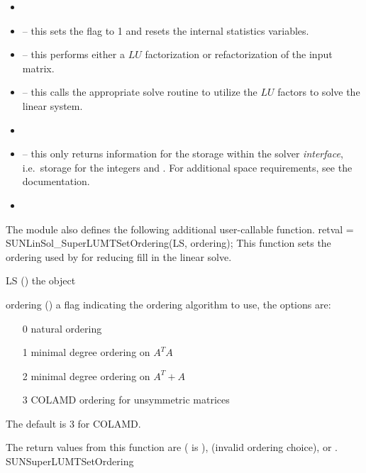 \begin{itemize}
\item {}
\item {} -- this sets the
   flag to 1 and resets the internal {\superlumt}
  statistics variables.
\item {} -- this performs either a $LU$
  factorization or refactorization of the input matrix.
\item {} -- this calls the appropriate
  {\superlumt} solve routine to utilize the $LU$ factors to solve the
  linear system.
\item {}
\item {} -- this only returns information for
  the storage within the solver \emph{interface}, i.e.~storage for the
  integers  and .  For additional
  space requirements, see the {\superlumt} documentation.
\item {}
\end{itemize}

The {\sunlinsolslumt} module also defines the following additional
user-callable function.
%
%
{
  retval = SUNLinSol\_SuperLUMTSetOrdering(LS, ordering);
}
{
  This function sets the ordering used by {\superlumt} for reducing fill in
  the linear solve.
}
{
  \begin{args}[ordering]
  \item[LS] ()
    the {\sunlinsolslumt} object
  \item[ordering] ()
    a flag indicating the ordering algorithm to use, the options are:
    \begin{itemize}
    \item[0] natural ordering
    \item[1] minimal degree ordering on $A^TA$
    \item[2] minimal degree ordering on $A^T+A$
    \item[3] COLAMD ordering for unsymmetric matrices
    \end{itemize}
    The default is 3 for COLAMD.
  \end{args}
}
{
  The return values from this function are 
  ( is ), \newline {}
  (invalid ordering choice), or .
}
{}
{SUNSuperLUMTSetOrdering}

